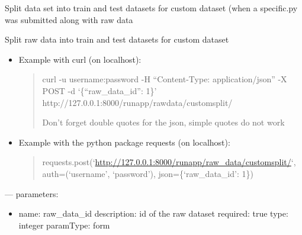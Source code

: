 \documentclass[letterpaper,10pt,english]{sphinxmanual}
\begin{document}
\begin{fulllineitems}
\label{modules/views:runapp.views.CustomSplitTrainTest}
Split data set into train and test datasets for custom dataset
(when a specific.py was submitted along with raw data

\begin{fulllineitems}
\label{modules/views:runapp.views.CustomSplitTrainTest.post}
Split raw data into train and test datasets for custom dataset
\begin{itemize}
\item {} 
Example with curl (on localhost):
\begin{quote}

curl -u username:password -H ``Content-Type: application/json''            -X POST            -d `\{``raw\_data\_id'': 1\}'                http://127.0.0.1:8000/runapp/rawdata/customsplit/

Don't forget double quotes for the json, simple quotes do not work
\end{quote}

\item {} 
Example with the python package requests (on localhost):
\begin{quote}

requests.post(`\url{http://127.0.0.1:8000/runapp/raw\_data/customsplit/}`,                          auth=(`username', `password'),                          json=\{`raw\_data\_id': 1\})
\end{quote}

\end{itemize}

---
parameters:
\begin{itemize}
\item {} 
name: raw\_data\_id
description: id of the raw dataset
required: true
type: integer
paramType: form

\end{itemize}

\end{fulllineitems}


\end{fulllineitems}

\end{document}
